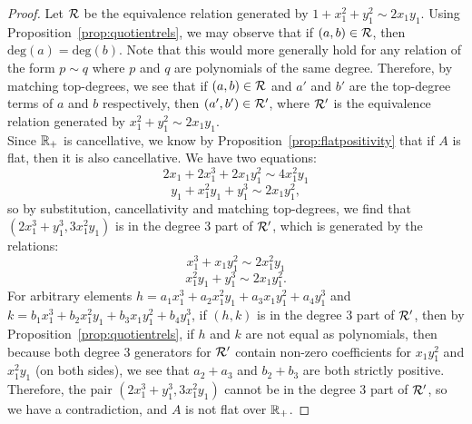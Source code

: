 \begin{proof}
Let $\cal{R}$ be the equivalence relation generated by $1+x_1^2 + y_1^2 \sim 2x_1y_1$. Using Proposition~\ref{prop:quotientrels}, we may observe that if $(a,b) \in \cal{R}$, then
$\mathrm{deg}(a)=\mathrm{deg}(b)$. Note that this would more generally hold for any relation of the form $p \sim q$ where $p$ and $q$ are polynomials of the same degree. 
Therefore, by matching top-degrees, we see that if $(a,b) \in \cal{R}$ and $a'$ and $b'$ are the top-degree terms of $a$ and $b$ respectively,
then $(a',b') \in \cal{R}'$, where $\cal{R}'$ is the equivalence relation generated by $x_1^2+y_1^2 \sim 2x_1y_1$.\\
\indent Since $\bb{R}_{+}$ is cancellative, we know by Proposition~\ref{prop:flatpositivity} that if $A$ is flat, then it is also cancellative.
We have two equations:
\[2x_1 + 2x_1^3 + 2x_1y_1^2 \sim 4x_1^2y_1\]
\[y_1 + x_1^2y_1 +  y_1^3 \sim 2x_1y_1^2,\]
so by substitution, cancellativity and matching top-degrees, we find that $(2x_1^3 + y_1^3,3x_1^2y_1)$ is in the degree $3$ part of $\cal{R}'$, which is generated by the relations:
\[x_1^3 + x_1y_1^2 \sim 2x_1^2y_1\]
\[x_1^2y_1 + y_1^3 \sim 2x_1y_1^2.\]
For arbitrary elements $h=a_1x_1^3 + a_2x_1^2y_1 + a_3x_1y_1^2 + a_4y_1^3$ and $k=b_1x_1^3 + b_2x_1^2y_1 + b_3x_1y_1^2 + b_4y_1^3$, if 
$(h,k)$ is in the degree $3$ part of $\cal{R}'$, then by Proposition~\ref{prop:quotientrels}, if $h$ and $k$ are not equal as polynomials, 
then because both degree $3$ generators for $\cal{R}'$ contain non-zero coefficients for $x_1y_1^2$ and $x_1^2y_1$ (on both sides), we see that
$a_2 + a_3$ and $b_2 + b_3$ are both strictly positive. Therefore, the pair $(2x_1^3 + y_1^3,3x_1^2y_1)$ cannot be in the degree $3$ part of $\cal{R}'$, so we have a contradiction, 
and $A$ is not flat over $\bb{R}_{+}$.
\end{proof}
